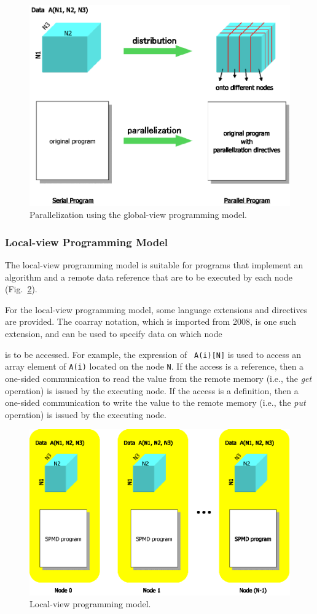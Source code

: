 \begin{figure}
  \centering
  \includegraphics[width=12cm]{figs/Fig2.eps}
  \caption{Parallelization using the global-view programming model.}
\label{fig2}
\end{figure}


\subsubsection{Local-view Programming Model}

The local-view programming model is suitable for programs that
implement an algorithm and a remote data reference that are to
be executed by each node (Fig.~\ref{fig3}).

For the local-view programming model, some language extensions and 
directives are provided. The coarray notation, which is imported from
{\Fort} 2008,
is one such extension, and can be used to specify data on which node 

is to be accessed. For example, the expression of {\tt
A(i)[N]} is used to access an array element of {\tt A(i)} located on the
node {\tt N}.
%
If the access is a reference, then a one-sided communication to read the
value from the remote memory (i.e., the {\it get} operation) is issued
by the executing node.
If the access is a definition, then a one-sided communication to write
the value to the remote memory (i.e., the {\it put} operation) is issued by
the executing node.

\begin{figure}
  \centering
  \includegraphics[width=12cm]{figs/Fig3.eps}
  \caption{Local-view programming model.}
\label{fig3}
\end{figure}


